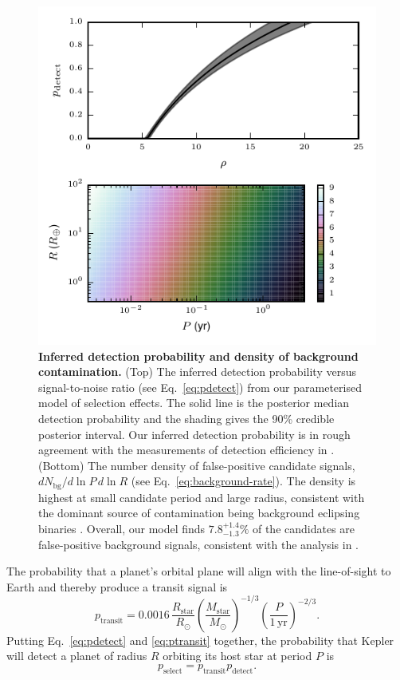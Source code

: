 \documentclass[apjl]{emulateapj}
\newcommand{\RSun}{R_\odot}
\newcommand{\RStar}{R_\mathrm{star}}
\newcommand{\MStar}{M_\mathrm{star}}
\newcommand{\MSun}{M_\odot}
\newcommand{\Nbg}{N_\mathrm{bg}}
\newcommand{\fposrange}{7.8_{-1.3}^{+1.4}\%}
\begin{document}
\begin{figure}
  \includegraphics[width=\columnwidth]{bg}
  \caption{\label{fig:det-bg} \textbf{Inferred detection probability
      and density of background contamination.} (Top) The inferred
    detection probability versus signal-to-noise ratio (see
    Eq.\ \eqref{eq:pdetect}) from our parameterised model of selection
    effects.  The solid line is the posterior median detection
    probability and the shading gives the 90\% credible posterior
    interval.  Our inferred detection probability is in rough
    agreement with the measurements of detection efficiency in
    \citet{Borucki2011,Batalha2013}.  (Bottom) The number density of
    false-positive candidate signals, $d\Nbg/d\ln P \, d\ln R$ (see
    Eq.\ \eqref{eq:background-rate}).  The density is highest at small
    candidate period and large radius, consistent with the dominant
    source of contamination being background eclipsing
    binaries \citep{Fressin2013}.  Overall, our model finds
    $\fposrange$ of the candidates are false-positive background
    signals, consistent with the analysis in \citet{Fressin2013}.}
\end{figure}

The probability that a planet's orbital plane will align with the
line-of-sight to Earth and thereby produce a transit signal is
\begin{equation}
  \label{eq:ptransit}
  p_\mathrm{transit} = 0.0016\, \frac{\RStar}{\RSun}
  \left(\frac{\MStar}{\MSun}\right)^{-1/3} \left(\frac{P}{1\,\mathrm{yr}}\right)^{-2/3}.
\end{equation}
Putting Eq.\ \ref{eq:pdetect} and \ref{eq:ptransit} together, the
probability that Kepler will detect a planet of radius $R$ orbiting
its host star at period $P$ is 
\begin{equation}
  \label{eq:pselect}
  p_\mathrm{select} = p_\mathrm{transit} p_\mathrm{detect}.
\end{equation}
\end{document}
